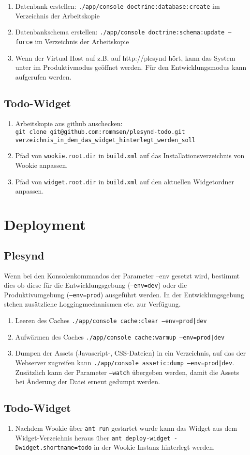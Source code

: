 \begin{enumerate}
 \item Datenbank erstellen: \texttt{./app/console doctrine:database:create} im Verzeichnis der Arbeitskopie
 \item Datenbankschema erstellen: \texttt{./app/console doctrine:schema:update --force} im Verzeichnis der Arbeitskopie
 \item Wenn der Virtual Host auf z.B. auf http://plesynd hört, kann das System unter  im Produktivmodus geöffnet werden. Für den Entwicklungsmodus kann  aufgerufen werden.   
\end{enumerate}

\subsection{Todo-Widget}
\begin{enumerate}
 \item Arbeitskopie aus github auschecken: \\
 \texttt{git clone git@github.com:rommsen/plesynd-todo.git}\\ 
 \texttt{verzeichnis\_in\_dem\_das\_widget\_hinterlegt\_werden\_soll}
 \item Pfad von \texttt{wookie.root.dir} in \texttt{build.xml} auf das Installationsverzeichnis von Wookie anpassen.
 \item Pfad von \texttt{widget.root.dir} in \texttt{build.xml} auf den aktuellen Widgetordner anpassen.
\end{enumerate}

\section{Deployment}

\subsection{Plesynd}
Wenn bei den Konsolenkommandos der Parameter --env gesetzt wird, bestimmt dies ob diese für die Entwicklungsgebung (\texttt{--env=dev}) oder die Produktivumgebung (\texttt{--env=prod}) ausgeführt werden. In der Entwicklungsgebung stehen zusätzliche Loggingmechanismen etc. zur Verfügung.
\begin{enumerate}
 \item Leeren des Caches \texttt{./app/console cache:clear --env=prod|dev}
 \item Aufwärmen des Caches \texttt{./app/console cache:warmup --env=prod|dev}
 \item Dumpen der Assets (Javascript-, CSS-Dateien) in ein Verzeichnis, auf das der Webserver zugreifen kann \texttt{./app/console assetic:dump --env=prod|dev}. Zusätzlich kann der Parameter \texttt{--watch} übergeben werden, damit die Assets bei Änderung der Datei erneut gedumpt werden.
\end{enumerate}
\subsection{Todo-Widget}
\begin{enumerate}
 \item Nachdem Wookie über \texttt{ant run} gestartet wurde kann das Widget aus dem Widget-Verzeichnis heraus über \texttt{ant deploy-widget -Dwidget.shortname=todo} in der Wookie Instanz hinterlegt werden.
\end{enumerate}